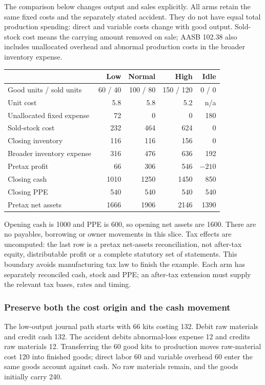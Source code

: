 The comparison below changes output and sales explicitly. All arms retain
the same fixed costs and the separately stated accident. They do not have
equal total production spending: direct and variable costs change with
good output. Sold-stock cost means the carrying amount removed on sale;
AASB 102.38 also includes unallocated overhead and abnormal production
costs in the broader inventory expense.

\begin{center}
\small
\begin{tabular}{lrrrr}
\toprule
& Low & Normal & High & Idle\\
\midrule
Good units / sold units & 60 / 40 & 100 / 80 & 150 / 120 & 0 / 0\\
Unit cost & 5.8 & 5.8 & 5.2 & n/a\\
Unallocated fixed expense & 72 & 0 & 0 & 180\\
Sold-stock cost & 232 & 464 & 624 & 0\\
Closing inventory & 116 & 116 & 156 & 0\\
Broader inventory expense & 316 & 476 & 636 & 192\\
Pretax profit & 66 & 306 & 546 & $-210$\\
Closing cash & 1010 & 1250 & 1450 & 850\\
Closing PPE & 540 & 540 & 540 & 540\\
Pretax net assets & 1666 & 1906 & 2146 & 1390\\
\bottomrule
\end{tabular}
\end{center}

Opening cash is 1000 and PPE is 600, so opening net assets are 1600.
There are no payables, borrowing or owner movements in this slice. Tax
effects are uncomputed: the last row is a pretax net-assets reconciliation,
not after-tax equity, distributable profit or a complete statutory set of
statements. This boundary avoids manufacturing tax law to finish the
example. Each arm has separately reconciled cash, stock and PPE; an
after-tax extension must supply the relevant tax bases, rates and timing.

\subsubsection{Preserve both the cost origin and the cash movement}

The low-output journal path starts with 66 kits costing 132. Debit raw
materials and credit cash 132. The accident debits abnormal-loss expense
12 and credits raw materials 12. Transferring the 60 good kits to
production moves raw-material cost 120 into finished goods; direct labor
60 and variable overhead 60 enter the same goods account against cash.
No raw materials remain, and the goods initially carry 240.

